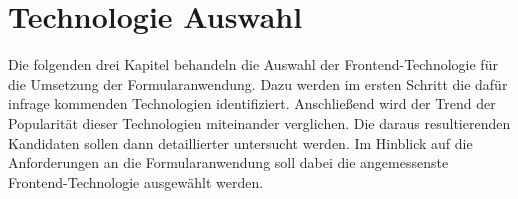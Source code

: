 \chapter{Technologie Auswahl}
\label{chap:Technologie-Auswahl}

Die folgenden drei Kapitel behandeln die Auswahl der Frontend-Technologie für die Umsetzung der Formularanwendung.
Dazu  werden im ersten Schritt die dafür infrage kommenden Technologien identifiziert.
 Anschließend wird der Trend der Popularität dieser Technologien miteinander verglichen.
Die daraus resultierenden Kandidaten sollen dann  detaillierter untersucht werden.
Im Hinblick auf die Anforderungen an die Formularanwendung soll dabei die angemessenste Frontend-Technologie ausgewählt werden.






